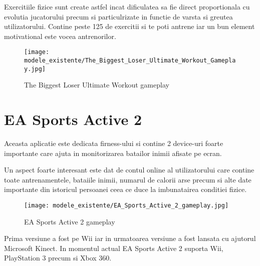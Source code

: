 \documentclass[12pt,a4paper]{report}
\begin{document}
Exercitiile fizice sunt create astfel incat dificulatea sa fie direct proportionala cu evolutia jucatorului precum si particulrizate in functie de varsta si greutea utilizatorului. Contine peste 125 de exercitii si te poti antrene iar un bun element motivational este vocea antrenorilor.

\begin{figure}[th]
\centering
\texttt{[image: modele\_existente/The\_Biggest\_Loser\_Ultimate\_Workout\_Gameplay.jpg]}
  \caption[The Biggest Loser Ultimate Workout gameplay]{The Biggest Loser Ultimate Workout gameplay\protect\footnotemark}
  \label{figure_1:picture_5}
\end{figure}


\section{EA Sports Active 2}

Aceasta aplicatie este dedicata firness-ului si contine 2 device-uri foarte importante care ajuta  in monitorizarea batailor inimii afisate pe ecran. 

Un aspect foarte interesant este dat de contul online al utilizatorului care contine toate antrenamentele, bataiile inimii, numarul de calorii arse precum si alte date importante din istoricul persoanei ceea ce duce la imbunatairea conditiei fizice.

\begin{figure}[th]
\centering
\texttt{[image: modele\_existente/EA\_Sports\_Active\_2\_gameplay.jpg]}
  \caption[EA Sports Active 2 Gameplay]{EA Sports Active 2 gameplay\protect\footnotemark}
  \label{figure_1:picture_6}
\end{figure}

Prima versiune a fost pe Wii iar in urmatoarea versiune a fost lansata cu ajutorul Microsoft Kinect. In momentul actual EA Sports Active 2 suporta Wii, PlayStation 3 precum si Xbox 360.

\end{document}

